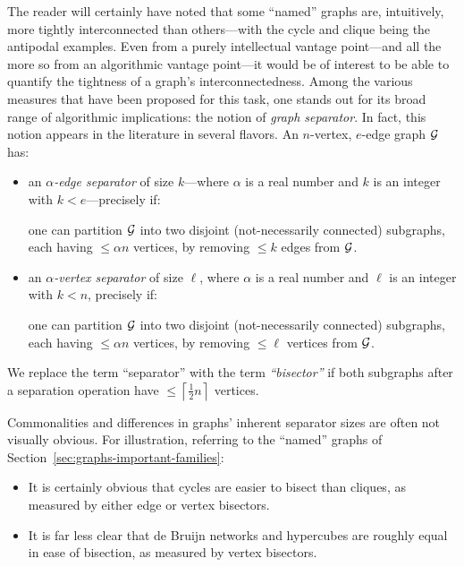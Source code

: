 \noindent
The reader will certainly have noted that some ``named'' graphs are, intuitively, more tightly interconnected than others---with the cycle and clique being the antipodal examples.  Even from a purely intellectual vantage point---and all the more so from an algorithmic vantage point---it would be of interest to be able to quantify the tightness of a graph's interconnectedness.  Among  the various measures that have been proposed for this task, one stands out for its broad range of algorithmic implications: the notion of {\it graph separator}.  In fact, this notion appears in the literature in several flavors.  An $n$-vertex, $e$-edge graph $\mbox{$\cal G$}$ has:
\begin{itemize}
\item
an {\it $\alpha$-edge separator} of size $k$---where $\alpha$ is a real number and $k$ is an integer with $k < e$---precisely if:


\smallskip

one can partition $\mbox{$\cal G$}$ into two disjoint (not-necessarily connected) subgraphs, each having 
$\leq \alpha n$ vertices, by removing $\leq k$ edges from $\mbox{$\cal G$}$.

\medskip\item
an {\it $\alpha$-vertex separator} of size $\ell$, where $\alpha$ is a real number and $\ell$ is an integer with $k < n$, precisely if:


\smallskip

one can partition $\mbox{$\cal G$}$ into two disjoint (not-necessarily connected) subgraphs, each having
$\leq \alpha n$ vertices, by removing $\leq \ell$ vertices from $\mbox{$\cal G$}$.
\end{itemize}
We replace the term ``separator'' with the term {\em ``bisector''} if both subgraphs after a separation operation have $\leq \left\lceil \frac{1}{2} n \right\rceil$ vertices.

 

\medskip

Commonalities and differences in graphs' inherent separator sizes are often not visually obvious.  For illustration, referring to the ``named'' graphs of Section~\ref{sec:graphs-important-families}:
\begin{itemize}
\item
It is certainly obvious that cycles are easier to bisect than cliques, as measured by either edge or vertex bisectors.
\medskip\item
It is far less clear that de Bruijn networks and hypercubes are roughly equal in ease of bisection, as measured by vertex bisectors.
\end{itemize}

